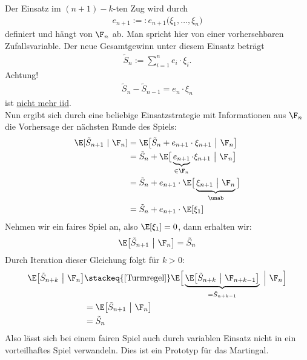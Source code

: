 \begin{beisp}
Der Einsatz im $(n+1)-k$-ten Zug wird durch 
\begin{align*}
e_{n+1}:=:e_{n+1}\big(\xi_1,\ldots,\xi_n\big)
\end{align*}
definiert und hängt von $\F_n$ ab. Man spricht hier von einer vorhersehbaren Zufallsvariable.
Der neue Gesamtgewinn unter diesem Einsatz beträgt
\begin{align*}
\tilde{S}_n:=\sum\limits_{i=1}^n e_i\cdot\xi_i.
\end{align*}
Achtung! 
\begin{align*}
\tilde{S}_n-\tilde{S}_{n-1}=e_n\cdot\xi_n
\end{align*}
ist \underline{nicht mehr iid}.\\

Nun ergibt sich durch eine beliebige Einsatzstrategie mit Informationen aus $\F_n$ die Vorhersage der nächsten Runde des Spiels:
\begin{align*}
\E[\tilde{S}_{n+1}~|~\F_n] 
&=\E\big[\tilde{S}_n+ e_{n+1}\cdot\xi_{n+1}~\big|~\F_n\big]\\
&=\tilde{S}_n+\E\big[\underbrace{e_{n+1}}_{\in\F_n}\cdot\xi_{n+1}~\big|~\F_n\big]\\
&=\tilde{S}_n+e_{n+1}\cdot\E\big[\underbrace{\xi_{n+1}~\big|~\F_n}_{\unab}\big]\\
&=\tilde{S}_n+e_{n+1}\cdot\E[\xi_1]
\end{align*}
Nehmen wir ein faires Spiel an, also $\E[\xi_1]=0$, dann erhalten wir:
\begin{align*}
\E\big[\tilde{S}_{n+1}~\big|~\F_n\big]=\tilde{S}_n
\end{align*}
Durch Iteration dieser Gleichung folgt für $k>0$:
\begin{align*}
\E\big[\tilde{S}_{n+k}~\big|~\F_n\big]
&\stackeq{\eqref{Turmregel}}
\E\Big[\underbrace{\E\big[\tilde{S}_{n+k}~\big|~\F_{n+k-1}\big]}_{=\tilde{S}_{n+k-1}}~\Big|~\F_n\Big]\\
&=\E\big[\tilde{S}_{n+1}~\big|~\F_n\big]\\
&=\tilde{S}_n
\end{align*}
Also lässt sich bei einem fairen Spiel auch durch variablen Einsatz nicht in ein vorteilhaftes Spiel verwandeln. Dies ist ein Prototyp für das Martingal.
\end{beisp}

